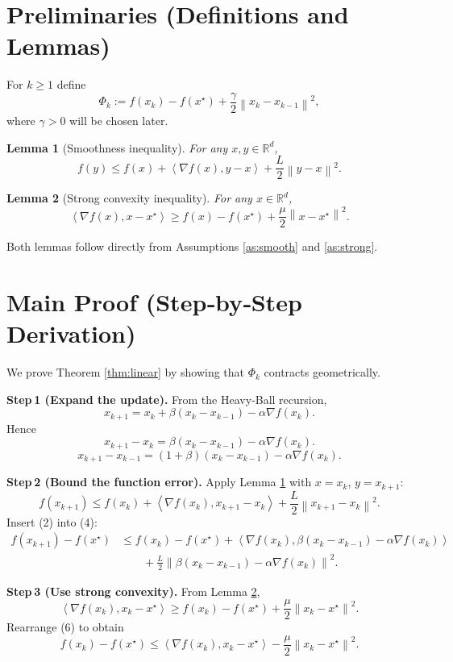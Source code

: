 \documentclass{article}
\newtheorem{lemma}{Lemma}
\newcommand{\norm}[1]{\left\lVert#1\right\rVert}
\newcommand{\inner}[2]{\left\langle #1,#2\right\rangle}
\newcommand{\R}{\mathbb{R}}
\begin{document}
\section*{Preliminaries (Definitions and Lemmas)}
\begin{definition}
For $k\ge1$ define
\[
\Phi_k:=f(x_k)-f(x^\star)+\frac{\gamma}{2}\norm{x_k-x_{k-1}}^{2},
\]
where $\gamma>0$ will be chosen later.
\end{definition}
\begin{lemma}[Smoothness inequality]\label{lem:smooth}
For any $x,y\in\R^{d}$,
\[
f(y)\le f(x)+\inner{\nabla f(x)}{y-x}+\frac{L}{2}\norm{y-x}^{2}.
\]
\end{lemma}
\begin{lemma}[Strong convexity inequality]\label{lem:strong}
For any $x\in\R^{d}$,
\[
\inner{\nabla f(x)}{x-x^\star}\ge f(x)-f(x^\star)+\frac{\mu}{2}\norm{x-x^\star}^{2}.
\]
\end{lemma}
Both lemmas follow directly from Assumptions \ref{as:smooth} and \ref{as:strong}.

\section*{Main Proof (Step‑by‑Step Derivation)}
We prove Theorem \ref{thm:linear} by showing that $\Phi_k$ contracts geometrically.

\bigskip
\noindent\textbf{Step 1 (Expand the update).}  
From the Heavy‑Ball recursion,
\[
x_{k+1}=x_k+\beta (x_k-x_{k-1})-\alpha \nabla f(x_k).
\tag{1}
\]
Hence
\[
x_{k+1}-x_k = \beta (x_k-x_{k-1})-\alpha \nabla f(x_k).
\tag{2}
\]
\[
x_{k+1}-x_{k-1}= (1+\beta)(x_k-x_{k-1})-\alpha \nabla f(x_k).
\tag{3}
\]

\bigskip
\noindent\textbf{Step 2 (Bound the function error).}  
Apply Lemma \ref{lem:smooth} with $x=x_k$, $y=x_{k+1}$:
\[
f(x_{k+1})\le f(x_k)+\inner{\nabla f(x_k)}{x_{k+1}-x_k}+\frac{L}{2}\norm{x_{k+1}-x_k}^{2}.
\tag{4}
\]
Insert (2) into (4):
\[
\begin{aligned}
f(x_{k+1})-f(x^\star)
&\le f(x_k)-f(x^\star)
   +\inner{\nabla f(x_k)}{\beta (x_k-x_{k-1})-\alpha \nabla f(x_k)}\\
&\qquad+\frac{L}{2}\norm{\beta (x_k-x_{k-1})-\alpha \nabla f(x_k)}^{2}.
\end{aligned}
\tag{5}
\]

\bigskip
\noindent\textbf{Step 3 (Use strong convexity).}  
From Lemma \ref{lem:strong},
\[
\inner{\nabla f(x_k)}{x_k-x^\star}\ge f(x_k)-f(x^\star)+\frac{\mu}{2}\norm{x_k-x^\star}^{2}.
\tag{6}
\]
Rearrange (6) to obtain
\[
f(x_k)-f(x^\star)\le \inner{\nabla f(x_k)}{x_k-x^\star}-\frac{\mu}{2}\norm{x_k-x^\star}^{2}.
\tag{7}
\]
\end{document}
